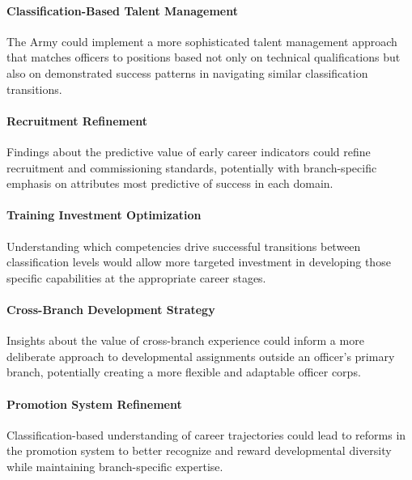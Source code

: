 \documentclass[../main.tex]{subfiles}
\begin{document}
\paragraph{Classification-Based Talent Management} The Army could implement a more sophisticated talent management approach that matches officers to positions based not only on technical qualifications but also on demonstrated success patterns in navigating similar classification transitions.

\paragraph{Recruitment Refinement} Findings about the predictive value of early career indicators could refine recruitment and commissioning standards, potentially with branch-specific emphasis on attributes most predictive of success in each domain.

\paragraph{Training Investment Optimization} Understanding which competencies drive successful transitions between classification levels would allow more targeted investment in developing those specific capabilities at the appropriate career stages.

\paragraph{Cross-Branch Development Strategy} Insights about the value of cross-branch experience could inform a more deliberate approach to developmental assignments outside an officer's primary branch, potentially creating a more flexible and adaptable officer corps.

\paragraph{Promotion System Refinement} Classification-based understanding of career trajectories could lead to reforms in the promotion system to better recognize and reward developmental diversity while maintaining branch-specific expertise.

\end{document}
